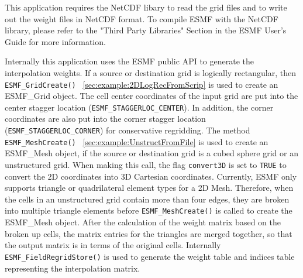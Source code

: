 This application requires the NetCDF libary to read the grid files and to write out the weight files in NetCDF format.  To compile ESMF with
the NetCDF library, please refer to the "Third Party Libraries" Section in the ESMF User's Guide for more information.

Internally this application uses the ESMF public API to generate the interpolation weights.
If a source or destination grid is logically rectangular, then {\tt ESMF\_GridCreate()}
~\ref{sec:example:2DLogRecFromScrip}
is used to create an ESMF\_Grid object. The cell center
coordinates of the input grid are put into the center stagger location ({\tt ESMF\_STAGGERLOC\_CENTER}).
In addition, the corner coordinates are also put into the corner stagger location
({\tt ESMF\_STAGGERLOC\_CORNER}) for conservative regridding.  The method
{\tt ESMF\_MeshCreate()}
~\ref{sec:example:UnstructFromFile}
is used to create an ESMF\_Mesh object, if the
source or destination grid is a cubed sphere grid or an unstructured grid. When making this call,
the flag {\tt convert3D} is set to {\tt TRUE} to convert the 2D coordinates into 3D Cartesian coordinates. Currently, ESMF only supports
triangle or quadrilateral element types for a 2D Mesh.  Therefore, when the cells in an unstructured grid contain more than four edges, they are broken into multiple triangle elements before {\tt ESMF\_MeshCreate()} is called to create the ESMF\_Mesh object. After the calculation of the weight matrix based on the broken up
cells, the matrix entries for the triangles are merged together, so that the output matrix is in terms of the original cells.
Internally {\tt ESMF\_FieldRegridStore()} is used to generate the weight table and indices table representing the interpolation matrix.

